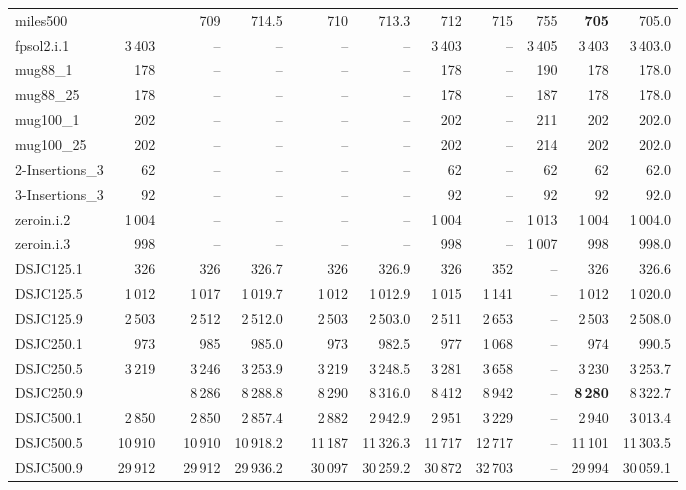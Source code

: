 \documentclass{elsart}
\begin{document}
\begin{table}
\begin{scriptsize}
\begin{tabular}{l@{ }r@{ }c@{ }rr@{ }c@{ }rrrrrrr}
miles500    &   &&  709 & 714.5 && 710 & 713.3 & 712 &  715 & 755 & \textbf{705} & 705.0 \\
fpsol2.i.1    &3\,403  && -- & -- && --   & -- & 3\,403 &--&3\,405   &3\,403  & 3\,403.0  \\
mug88\_1  &178  && -- & -- && --   & -- & 178  &-- &190 &178  & 178.0    \\
mug88\_25  &178  && -- & -- && --   & -- & 178   &-- &187&178  & 178.0   \\
mug100\_1  &202  && -- & -- && --   & -- & 202  &--&211&202  & 202.0   \\
mug100\_25  & 202  & & -- & -- && --   & -- & 202  & --  & 214   & 202  & 202.0   \\
2-Insertions\_3 & 62   && -- & -- && --   & -- & 62  & --& 62 & 62   & 62.0  \\
3-Insertions\_3  &92  && -- & -- && --   & -- & 92  &-- &92 &92  & 92.0   \\
zeroin.i.2  &1\,004 && -- & -- && --   & -- & 1\,004   &-- &1\,013&1\,004  & 1\,004.0  \\
zeroin.i.3 &998  && -- & -- && --   & -- & 998  &--&1\,007 &998  & 998.0   \\
\hline
DSJC125.1   & 326  && 326 & 326.7  && 326  & 326.9 & 326& 352& -- &326  & 326.6 \\
DSJC125.5 & 1\,012   &&  1\,017  & 1\,019.7 && 1\,012 & 1\,012.9  &  1\,015 &  1\,141 &  --  & 1\,012 &  1\,020.0 \\
DSJC125.9    & 2\,503   && 2\,512 & 2\,512.0   && 2\,503  & 2\,503.0 & 2\,511  & 2\,653 & -- & 2\,503  & 2\,508.0 \\
DSJC250.1    & 973  && 985 & 985.0   && 973  & 982.5 & 977  & 1\,068 & --& 974  & 990.5 \\
DSJC250.5    &3\,219  && 3\,246 & 3\,253.9   &&3\,219  & 3\,248.5 & 3\,281&3\,658 & -- &  3\,230 & 3\,253.7   \\
DSJC250.9   &   && 8\,286 & 8\,288.8  &&  8\,290  & 8\,316.0 & 8\,412&8\,942&-- &\textbf{8\,280} & 8\,322.7   \\

DSJC500.1    & 2\,850  && 2\,850 &  2\,857.4   &&  2\,882  & 2\,942.9 & 2\,951  & 3\,229 & --& 2\,940  & 3\,013.4 \\
DSJC500.5    &10\,910  &&10\,910 & 10\,918.2   &&11\,187  & 11\,326.3 & 11\,717 &12\,717 & -- &  11\,101 &  11\,303.5  \\
DSJC500.9   & 29\,912  &&29\,912 & 29\,936.2  &&  30\,097  &  30\,259.2 &30\,872 &32\,703 &-- &29\,994 & 30\,059.1  \\


\end{tabular}
\end{scriptsize}
\end{table}
\end{document}
